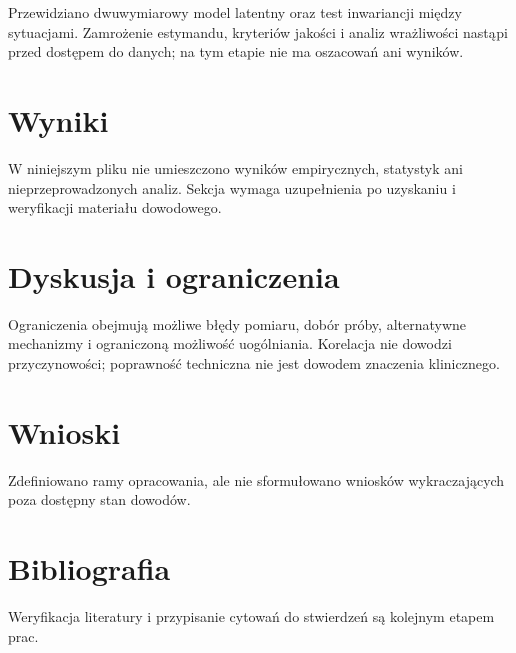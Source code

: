 \documentclass[11pt,a4paper]{article}
\begin{document}
Przewidziano dwuwymiarowy model latentny oraz test inwariancji między sytuacjami. Zamrożenie estymandu, kryteriów jakości i analiz wrażliwości nastąpi przed dostępem do danych; na tym etapie nie ma oszacowań ani wyników.

\section{Wyniki}

W niniejszym pliku nie umieszczono wyników empirycznych, statystyk ani nieprzeprowadzonych analiz. Sekcja wymaga uzupełnienia po uzyskaniu i weryfikacji materiału dowodowego.

\section{Dyskusja i ograniczenia}

Ograniczenia obejmują możliwe błędy pomiaru, dobór próby, alternatywne mechanizmy i ograniczoną możliwość uogólniania. Korelacja nie dowodzi przyczynowości; poprawność techniczna nie jest dowodem znaczenia klinicznego.

\section{Wnioski}

Zdefiniowano ramy opracowania, ale nie sformułowano wniosków wykraczających poza dostępny stan dowodów.

\section*{Bibliografia}

Weryfikacja literatury i przypisanie cytowań do stwierdzeń są kolejnym etapem prac.
\end{document}

